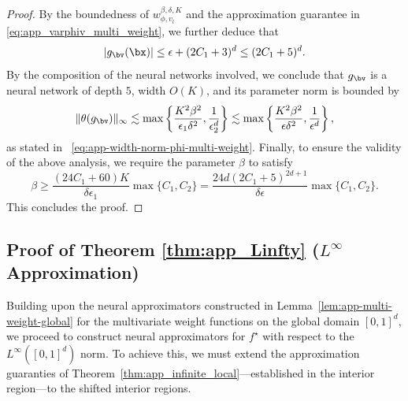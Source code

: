 \documentclass[11pt]{article}
\begin{document}
\begin{proof}
    
    By the boundedness of $ w_{\phi,v_l}^{\beta, \delta, K} $ and the approximation guarantee in \eqref{eq:app_varphiv_multi_weight}, we further deduce that
    \begin{equation*}
        |g_{\bv} (\bx)| \leq \epsilon + (2C_1+3)^d \leq (2C_1+5)^d.
    \end{equation*}
    By the composition of the neural networks involved, we conclude that $g_{\bv}$ is a neural network of depth $5$, width $O(K)$, and its parameter norm is bounded by
    \begin{equation*}
        \|\theta(g_{\bv})\|_{\infty} \lesssim \max \left\{ \frac{K^2 \beta^2}{\epsilon_1 \delta^2}, \frac{1}{\epsilon_2^d}\right\} \lesssim \max \left\{ \frac{K^2 \beta^2}{\epsilon \delta^2}, \frac{1}{\epsilon^d}\right\},
    \end{equation*}
    as stated in ~\eqref{eq:app-width-norm-phi-multi-weight}.
    Finally, to ensure the validity of the above analysis, we require the parameter
     $\beta$ to satisfy
    \begin{equation*}
        \beta \geq \frac{(24C_1+60)K}{\delta \epsilon_1} \max \{C_1, C_2\} = \frac{24 d (2C_1+5)^{2d+1}}{\delta \epsilon} \max\{C_1, C_2\}.
    \end{equation*}
    This concludes the proof. 
\end{proof}

\subsection{Proof of Theorem \ref{thm:app_Linfty} (\texorpdfstring{$L^{\infty}$}{L-infinity} Approximation)}
\label{subapp:L-infty}

Building upon the neural approximators constructed in Lemma~\ref{lem:app-multi-weight-global} for the multivariate weight functions on the global domain $[0,1]^d$, we proceed to construct neural approximators for $f^{\star}$ with respect to the $L^{\infty}([0,1]^d)$ norm. To achieve this, we must extend the approximation guaranties of Theorem~\ref{thm:app_infinite_local}---established in the interior region---to the shifted interior regions.

\end{document}
